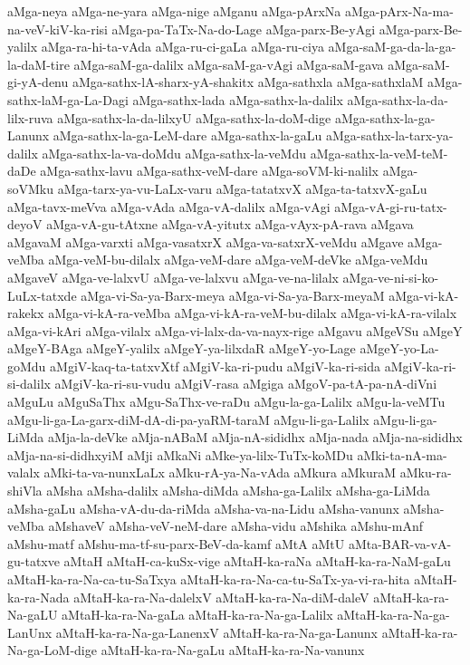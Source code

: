 {aMga-neya
aMga-ne-yara
aMga-nige
aMganu
aMga-pArxNa
aMga-pArx-Na-ma-na-veV-kiV-ka-risi
aMga-pa-TaTx-Na-do-Lage
aMga-parx-Be-yAgi
aMga-parx-Be-yalilx
aMga-ra-hi-ta-vAda
aMga-ru-ci-gaLa
aMga-ru-ciya
aMga-saM-ga-da-la-ga-la-daM-tire
aMga-saM-ga-dalilx
aMga-saM-ga-vAgi
aMga-saM-gava
aMga-saM-gi-yA-denu
aMga-sathx-lA-sharx-yA-shakitx
aMga-sathxla
aMga-sathxlaM
aMga-sathx-laM-ga-La-Dagi
aMga-sathx-lada
aMga-sathx-la-dalilx
aMga-sathx-la-da-lilx-ruva
aMga-sathx-la-da-lilxyU
aMga-sathx-la-doM-dige
aMga-sathx-la-ga-Lanunx
aMga-sathx-la-ga-LeM-dare
aMga-sathx-la-gaLu
aMga-sathx-la-tarx-ya-dalilx
aMga-sathx-la-va-doMdu
aMga-sathx-la-veMdu
aMga-sathx-la-veM-teM-daDe
aMga-sathx-lavu
aMga-sathx-veM-dare
aMga-soVM-ki-nalilx
aMga-soVMku
aMga-tarx-ya-vu-LaLx-varu
aMga-tatatxvX
aMga-ta-tatxvX-gaLu
aMga-tavx-meVva
aMga-vAda
aMga-vA-dalilx
aMga-vAgi
aMga-vA-gi-ru-tatx-deyoV
aMga-vA-gu-tAtxne
aMga-vA-yitutx
aMga-vAyx-pA-rava
aMgava
aMgavaM
aMga-varxti
aMga-vasatxrX
aMga-va-satxrX-veMdu
aMgave
aMga-veMba
aMga-veM-bu-dilalx
aMga-veM-dare
aMga-veM-deVke
aMga-veMdu
aMgaveV
aMga-ve-lalxvU
aMga-ve-lalxvu
aMga-ve-na-lilalx
aMga-ve-ni-si-ko-LuLx-tatxde
aMga-vi-Sa-ya-Barx-meya
aMga-vi-Sa-ya-Barx-meyaM
aMga-vi-kA-rakekx
aMga-vi-kA-ra-veMba
aMga-vi-kA-ra-veM-bu-dilalx
aMga-vi-kA-ra-vilalx
aMga-vi-kAri
aMga-vilalx
aMga-vi-lalx-da-va-nayx-rige
aMgavu
aMgeVSu
aMgeY
aMgeY-BAga
aMgeY-yalilx
aMgeY-ya-lilxdaR
aMgeY-yo-Lage
aMgeY-yo-La-goMdu
aMgiV-kaq-ta-tatxvXtf
aMgiV-ka-ri-pudu
aMgiV-ka-ri-sida
aMgiV-ka-ri-si-dalilx
aMgiV-ka-ri-su-vudu
aMgiV-rasa
aMgiga
aMgoV-pa-tA-pa-nA-diVni
aMguLu
aMguSaThx
aMgu-SaThx-ve-raDu
aMgu-la-ga-Lalilx
aMgu-la-veMTu
aMgu-li-ga-La-garx-diM-dA-di-pa-yaRM-taraM
aMgu-li-ga-Lalilx
aMgu-li-ga-LiMda
aMja-la-deVke
aMja-nABaM
aMja-nA-sididhx
aMja-nada
aMja-na-sididhx
aMja-na-si-didhxyiM
aMji
aMkaNi
aMke-ya-lilx-TuTx-koMDu
aMki-ta-nA-ma-valalx
aMki-ta-va-nunxLaLx
aMku-rA-ya-Na-vAda
aMkura
aMkuraM
aMku-ra-shiVla
aMsha
aMsha-dalilx
aMsha-diMda
aMsha-ga-Lalilx
aMsha-ga-LiMda
aMsha-gaLu
aMsha-vA-du-da-riMda
aMsha-va-na-Lidu
aMsha-vanunx
aMsha-veMba
aMshaveV
aMsha-veV-neM-dare
aMsha-vidu
aMshika
aMshu-mAnf
aMshu-matf
aMshu-ma-tf-su-parx-BeV-da-kamf
aMtA
aMtU
aMta-BAR-va-vA-gu-tatxve
aMtaH
aMtaH-ca-kuSx-vige
aMtaH-ka-raNa
aMtaH-ka-ra-NaM-gaLu
aMtaH-ka-ra-Na-ca-tu-SaTxya
aMtaH-ka-ra-Na-ca-tu-SaTx-ya-vi-ra-hita
aMtaH-ka-ra-Nada
aMtaH-ka-ra-Na-dalelxV
aMtaH-ka-ra-Na-diM-daleV
aMtaH-ka-ra-Na-gaLU
aMtaH-ka-ra-Na-gaLa
aMtaH-ka-ra-Na-ga-Lalilx
aMtaH-ka-ra-Na-ga-LanUnx
aMtaH-ka-ra-Na-ga-LanenxV
aMtaH-ka-ra-Na-ga-Lanunx
aMtaH-ka-ra-Na-ga-LoM-dige
aMtaH-ka-ra-Na-gaLu
aMtaH-ka-ra-Na-vanunx
}
